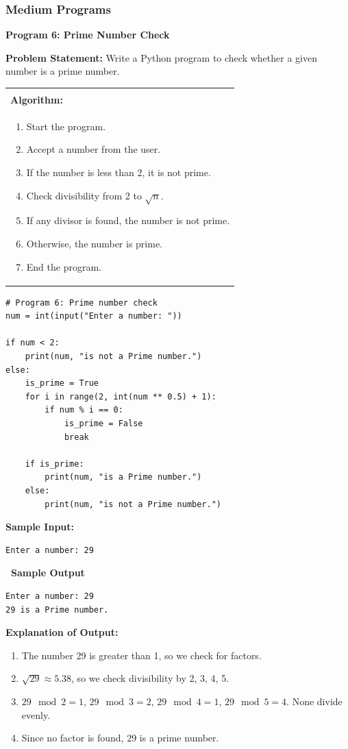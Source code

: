 \documentclass[12pt,a4paper]{article}
\makeatletter
\newcommand{\outhead}{\noindent\colorbox{cmrgreen!25}%
  {\textbf{\small\color{cmrdark}~Sample Output~}}\par\vspace{-1pt}}
\newenvironment{algobox}{%
  \par\vspace{4pt}%
  \noindent\begin{tabular}{@{}p{\linewidth}@{}}%
  \hline\\[-8pt]%
  \textbf{\color{blue!60!black}\small Algorithm:}\\[2pt]%
}{%
  \\[-4pt]\hline%
  \end{tabular}\par\vspace{4pt}%
}
\makeatother
\begin{document}
\subsubsection{Medium Programs}

\textbf{Program 6: Prime Number Check}

\textbf{Problem Statement:}
Write a Python program to check whether a given number is a prime number.

\begin{algobox}
\begin{enumerate}[label=Step \arabic*:]
  \item Start the program.
  \item Accept a number from the user.
  \item If the number is less than 2, it is not prime.
  \item Check divisibility from 2 to $\sqrt{n}$.
  \item If any divisor is found, the number is not prime.
  \item Otherwise, the number is prime.
  \item End the program.
\end{enumerate}
\end{algobox}

\begin{lstlisting}
# Program 6: Prime number check
num = int(input("Enter a number: "))

if num < 2:
    print(num, "is not a Prime number.")
else:
    is_prime = True
    for i in range(2, int(num ** 0.5) + 1):
        if num % i == 0:
            is_prime = False
            break

    if is_prime:
        print(num, "is a Prime number.")
    else:
        print(num, "is not a Prime number.")
\end{lstlisting}

\textbf{Sample Input:}
\begin{verbatim}
Enter a number: 29
\end{verbatim}

\outhead
\begin{lstlisting}[style=outputstyle]
Enter a number: 29
29 is a Prime number.
\end{lstlisting}

\textbf{Explanation of Output:}
\begin{enumerate}
  \item The number 29 is greater than 1, so we check for factors.
  \item $\sqrt{29} \approx 5.38$, so we check divisibility by 2, 3, 4, 5.
  \item $29 \mod 2 = 1$, $29 \mod 3 = 2$, $29 \mod 4 = 1$, $29 \mod 5 = 4$. None divide evenly.
  \item Since no factor is found, 29 is a prime number.
\end{enumerate}
\end{document}
